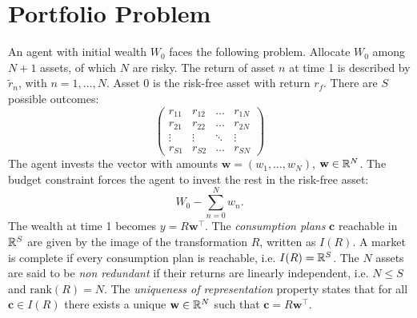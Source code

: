 \documentclass[twoside]{article}
\begin{document}
\section{Portfolio Problem}

An agent with initial wealth $W_0$ faces the following problem. Allocate $W_0$ among $N+1$ assets, of which $N$ are risky. The return of asset $n$ at time 1 is described by $\tilde{r}_n$, with $n = 1, \dots, N$. Asset 0 is the risk-free asset with return $r_f$. There are $S$ possible outcomes:
\[
    \begin{pmatrix}
        r_{11} & r_{12} & \dots & r_{1N} \\
        r_{21} & r_{22} & \dots & r_{2N} \\
        \vdots & \vdots & \ddots & \vdots \\
        r_{S1} & r_{S2} & \dots & r_{SN}
    \end{pmatrix}
\]
The agent invests the vector with amounts $\mathbf{w} = (w_1, \dots, w_N)$, $\mathbf{w} \in \mathbb{R}^{N}$. The budget constraint forces the agent to invest the rest in the risk-free asset:
\[
    W_0 - \sum_{n=0}^N w_n.
\]
The wealth at time 1 becomes $y = R\mathbf{w}^\top$. The \textit{consumption plans} $\mathbf{c}$ reachable in $\mathbb{R}^S$ are given by the image of the transformation $R$, written as $I(R)$. A market is complete if every consumption plan is reachable, i.e. $I(R) = \mathbb{R}^S$. The $N$ assets are said to be \textit{non redundant} if their returns are linearly independent, i.e. $N \leq S$ and $\text{rank}(R) = N$. The \textit{uniqueness of representation} property states that for all $\mathbf{c} \in I(R)$ there exists a unique $\mathbf{w} \in \mathbb{R}^N$ such that $\mathbf{c} = R\mathbf{w}^\top$. 

\end{document}
